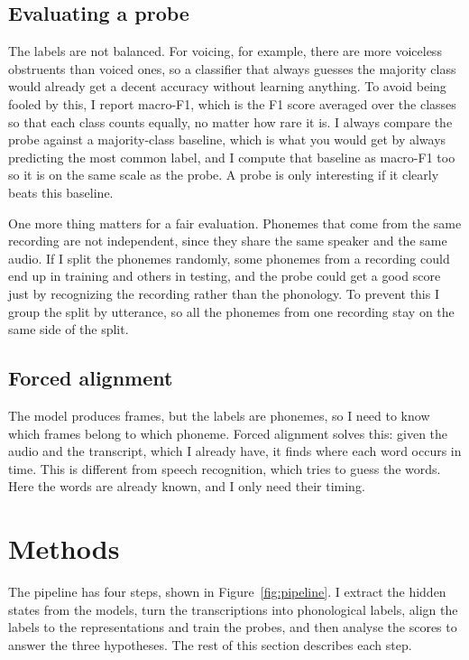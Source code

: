 \documentclass[twoside,11pt]{article}
\begin{document}
\subsection{Evaluating a probe}
The labels are not balanced. For voicing, for example, there are more voiceless
obstruents than voiced ones, so a classifier that always guesses the majority class
would already get a decent accuracy without learning anything. To avoid being
fooled by this, I report macro-F1, which is the F1 score averaged over the classes
so that each class counts equally, no matter how rare it is. I always compare the
probe against a majority-class baseline, which is what you would get by always
predicting the most common label, and I compute that baseline as macro-F1 too so it
is on the same scale as the probe. A probe is only interesting if it clearly beats
this baseline.

One more thing matters for a fair evaluation. Phonemes that come from the same
recording are not independent, since they share the same speaker and the same
audio. If I split the phonemes randomly, some phonemes from a recording could end up
in training and others in testing, and the probe could get a good score just by
recognizing the recording rather than the phonology. To prevent this I group the
split by utterance, so all the phonemes from one recording stay on the same side of
the split.

\subsection{Forced alignment}
The model produces frames, but the labels are phonemes, so I need to know which
frames belong to which phoneme. Forced alignment solves this: given the audio and
the transcript, which I already have, it finds where each word occurs in time.
This is different from speech recognition, which tries to guess the words. Here the
words are already known, and I only need their timing.

\section{Methods}

The pipeline has four steps, shown in Figure~\ref{fig:pipeline}. I extract the
hidden states from the models, turn the transcriptions into phonological labels,
align the labels to the representations and train the probes, and then analyse the
scores to answer the three hypotheses. The rest of this section describes each step.
\end{document}
